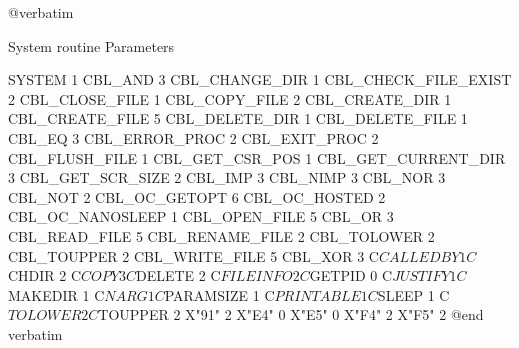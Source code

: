 @verbatim

System routine			Parameters

SYSTEM				1
CBL_AND				3
CBL_CHANGE_DIR			1
CBL_CHECK_FILE_EXIST		2
CBL_CLOSE_FILE			1
CBL_COPY_FILE			2
CBL_CREATE_DIR			1
CBL_CREATE_FILE			5
CBL_DELETE_DIR			1
CBL_DELETE_FILE			1
CBL_EQ				3
CBL_ERROR_PROC			2
CBL_EXIT_PROC			2
CBL_FLUSH_FILE			1
CBL_GET_CSR_POS			1
CBL_GET_CURRENT_DIR		3
CBL_GET_SCR_SIZE		2
CBL_IMP				3
CBL_NIMP			3
CBL_NOR				3
CBL_NOT				2
CBL_OC_GETOPT			6
CBL_OC_HOSTED			2
CBL_OC_NANOSLEEP		1
CBL_OPEN_FILE			5
CBL_OR				3
CBL_READ_FILE			5
CBL_RENAME_FILE			2
CBL_TOLOWER			2
CBL_TOUPPER			2
CBL_WRITE_FILE			5
CBL_XOR				3
C$CALLEDBY			1
C$CHDIR				2
C$COPY				3
C$DELETE			2
C$FILEINFO			2
C$GETPID			0
C$JUSTIFY			1
C$MAKEDIR			1
C$NARG				1
C$PARAMSIZE			1
C$PRINTABLE			1
C$SLEEP				1
C$TOLOWER			2
C$TOUPPER			2
X"91"				2
X"E4"				0
X"E5"				0
X"F4"				2
X"F5"				2
@end verbatim


